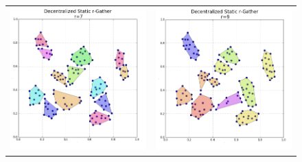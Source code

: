 \begin{figure}[htpb]
\begin{center}
\begin{tabular}{cc}
\vspace*{-12mm}
	\includegraphics[scale=0.25]{figs/r7.png} & 
	\includegraphics[scale=0.25]{figs/r9.png} 	\\

\end{tabular}
\end{center}
\end{figure}
